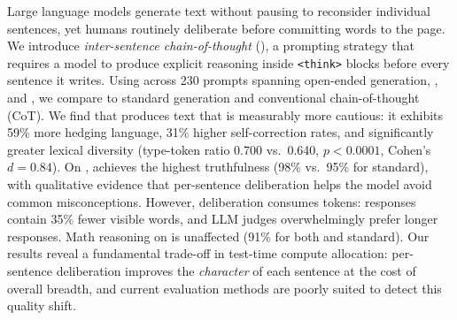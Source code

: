 Large language models generate text without pausing to reconsider individual sentences,
yet humans routinely deliberate before committing words to the page.
We introduce \emph{inter-sentence chain-of-thought} (\iscotshort), a prompting strategy that requires a model to produce explicit reasoning inside \texttt{<think>} blocks before every sentence it writes.
Using \gptfour across 230 prompts spanning open-ended generation, \truthfulqa, and \gsmk, we compare \iscotshort to standard generation and conventional chain-of-thought (CoT).
We find that \iscotshort produces text that is measurably more cautious: it exhibits 59\% more hedging language, 31\% higher self-correction rates, and significantly greater lexical diversity (type-token ratio 0.700 vs.\ 0.640, $p<0.0001$, Cohen's $d=0.84$).
On \truthfulqa, \iscotshort achieves the highest truthfulness (98\% vs.\ 95\% for standard), with qualitative evidence that per-sentence deliberation helps the model avoid common misconceptions.
However, deliberation consumes tokens: \iscotshort responses contain 35\% fewer visible words, and LLM judges overwhelmingly prefer longer responses.
Math reasoning on \gsmk is unaffected (91\% for both \iscotshort and standard).
Our results reveal a fundamental trade-off in test-time compute allocation: per-sentence deliberation improves the \emph{character} of each sentence at the cost of overall breadth, and current evaluation methods are poorly suited to detect this quality shift.
